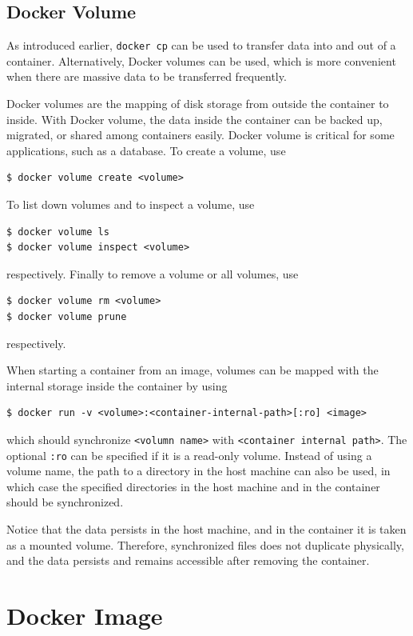 \subsection{Docker Volume}

As introduced earlier, \verb|docker cp| can be used to transfer data into and out of a container. Alternatively, Docker volumes can be used, which is more convenient when there are massive data to be transferred frequently. 

Docker volumes are the mapping of disk storage from outside the container to inside. With Docker volume, the data inside the container can be backed up, migrated, or shared among containers easily. Docker volume is critical for some applications, such as a database. To create a volume, use
\begin{lstlisting}
$ docker volume create <volume>
\end{lstlisting}
To list down volumes and to inspect a volume, use
\begin{lstlisting}
$ docker volume ls
$ docker volume inspect <volume>
\end{lstlisting}
respectively. Finally to remove a volume or all volumes, use
\begin{lstlisting}
$ docker volume rm <volume>
$ docker volume prune
\end{lstlisting}
respectively.

When starting a container from an image, volumes can be mapped with the internal storage inside the container by using
\begin{lstlisting}
$ docker run -v <volume>:<container-internal-path>[:ro] <image>
\end{lstlisting}
which should synchronize \verb|<volumn name>| with \verb|<container internal path>|. The optional \verb|:ro| can be specified if it is a read-only volume. Instead of using a volume name, the path to a directory in the host machine can also be used, in which case the specified directories in the host machine and in the container should be synchronized.

Notice that the data persists in the host machine, and in the container it is taken as a mounted volume. Therefore, synchronized files does not duplicate physically, and the data persists and remains accessible after removing the container.

\section{Docker Image} \label{ch:vac:sec:di}


